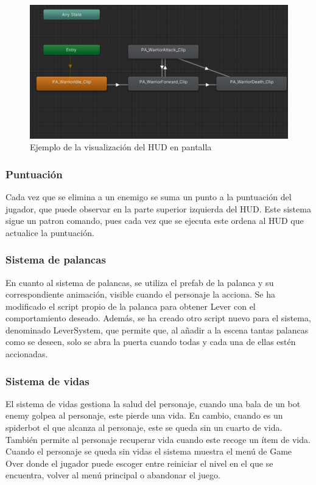 \begin{figure}[H]
	\centering
	\includegraphics[scale=0.65]{imagenes/MaquinaEstados.png}
	\caption{\label{fig:MaquinaEstados}Ejemplo de la visualización del HUD en pantalla}
\end{figure}

\subsubsection{Puntuación}
Cada vez que se elimina a un enemigo se suma un punto a la puntuación del jugador, que puede observar en la parte superior izquierda del HUD. Este sistema sigue un patron comando, pues cada vez que se ejecuta este ordena al HUD que actualice la puntuación.

\subsubsection{Sistema de palancas}
En cuanto al sistema de palancas, se utiliza el prefab de la palanca y su correspondiente animación, visible cuando el personaje la acciona. Se ha modificado el script propio de la palanca para obtener Lever con el comportamiento deseado. Además, se ha creado otro script nuevo para el sistema, denominado LeverSystem, que permite que, al añadir a la escena tantas palancas como se deseen, solo se abra la puerta cuando todas y cada una de ellas estén accionadas.

\subsubsection{Sistema de vidas}
El sistema de vidas gestiona la salud del personaje, cuando una bala de un bot enemy golpea al personaje, este pierde una vida. En cambio, cuando es un spiderbot el que alcanza al personaje, este se queda sin un cuarto de vida. También permite al personaje recuperar vida cuando este recoge un ítem de vida. Cuando el personaje se queda sin vidas el sistema muestra el menú de Game Over donde el jugador puede escoger entre reiniciar el nivel en el que se encuentra, volver al menú principal o abandonar el juego.

